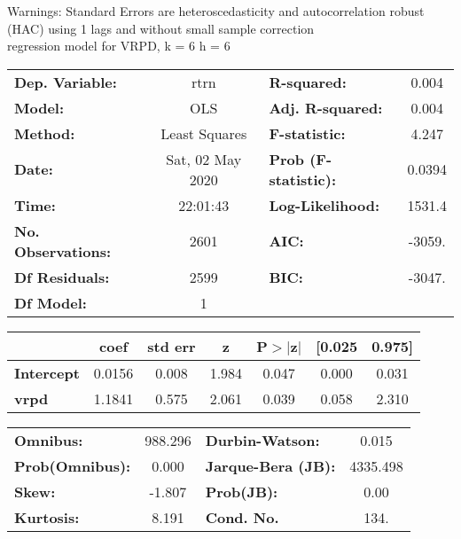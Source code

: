 Warnings: \newline
 [1] Standard Errors are heteroscedasticity and autocorrelation robust (HAC) using 1 lags and without small sample correction\\ 

regression model for VRPD, k = 6 h = 6\begin{center}
\begin{tabular}{lclc}
\toprule
\textbf{Dep. Variable:}    &       rtrn       & \textbf{  R-squared:         } &     0.004   \\
\textbf{Model:}            &       OLS        & \textbf{  Adj. R-squared:    } &     0.004   \\
\textbf{Method:}           &  Least Squares   & \textbf{  F-statistic:       } &     4.247   \\
\textbf{Date:}             & Sat, 02 May 2020 & \textbf{  Prob (F-statistic):} &   0.0394    \\
\textbf{Time:}             &     22:01:43     & \textbf{  Log-Likelihood:    } &    1531.4   \\
\textbf{No. Observations:} &        2601      & \textbf{  AIC:               } &    -3059.   \\
\textbf{Df Residuals:}     &        2599      & \textbf{  BIC:               } &    -3047.   \\
\textbf{Df Model:}         &           1      & \textbf{                     } &             \\
\bottomrule
\end{tabular}
\begin{tabular}{lcccccc}
                   & \textbf{coef} & \textbf{std err} & \textbf{z} & \textbf{P$> |$z$|$} & \textbf{[0.025} & \textbf{0.975]}  \\
\midrule
\textbf{Intercept} &       0.0156  &        0.008     &     1.984  &         0.047        &        0.000    &        0.031     \\
\textbf{vrpd}      &       1.1841  &        0.575     &     2.061  &         0.039        &        0.058    &        2.310     \\
\bottomrule
\end{tabular}
\begin{tabular}{lclc}
\textbf{Omnibus:}       & 988.296 & \textbf{  Durbin-Watson:     } &    0.015  \\
\textbf{Prob(Omnibus):} &   0.000 & \textbf{  Jarque-Bera (JB):  } & 4335.498  \\
\textbf{Skew:}          &  -1.807 & \textbf{  Prob(JB):          } &     0.00  \\
\textbf{Kurtosis:}      &   8.191 & \textbf{  Cond. No.          } &     134.  \\
\bottomrule
\end{tabular}
\end{center}

